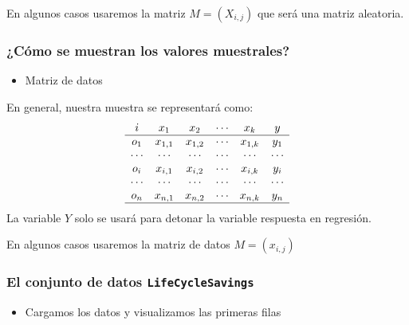 En algunos casos usaremos la matriz $M=(X_{i,j})$ que será una matriz aleatoria.
\subsubsection{¿Cómo se muestran los valores muestrales?}

\begin{figure}
\end{figure}

\begin{itemize}[label=\color{red}\textbullet, leftmargin=*]
	\item \color{lightblue}Matriz de datos
\end{itemize}

En general, nuestra muestra se representará como: 
\[ \begin{array}{cccccc}
i & x_1 & x_2 & \cdots & x_k & y \\ \hline
o_1 & x_{1,1} & x_{1,2} & \cdots & x_{1,k} & y_1 \\
\cdots & \cdots & \cdots & \cdots & \cdots & \cdots \\
o_i & x_{i,1} & x_{i,2} & \cdots & x_{i,k} & y_i \\
\cdots & \cdots & \cdots & \cdots & \cdots & \cdots \\
o_n & x_{n,1} & x_{n,2} & \cdots & x_{n,k} & y_n \\ \hline
\end{array} \]
La variable $Y$ solo se usará para detonar la variable respuesta en regresión.

En algunos casos usaremos la matriz de datos $M=(x_{i,j})$

\subsubsection{El conjunto de datos \textbf{\texttt{LifeCycleSavings}}}

\begin{itemize}[label=\color{red}\textbullet, leftmargin=*]
	\item \color{lightblue}Cargamos los datos y visualizamos las primeras filas
\end{itemize}

